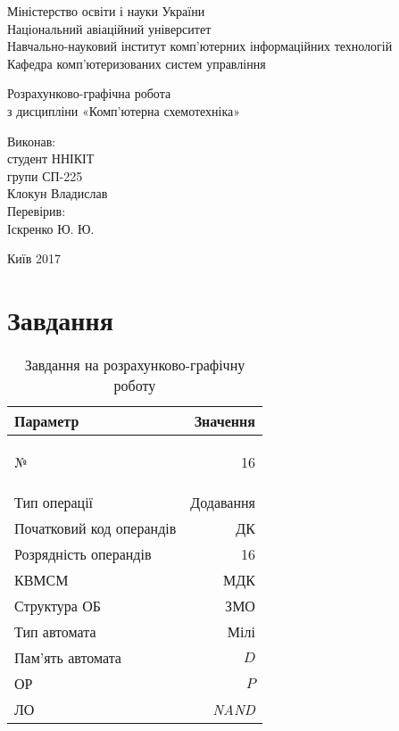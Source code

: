 \documentclass[a4paper,oneside,DIV=12,12pt]{scrartcl}
\begin{document}
	\begin{titlepage}
		\begin{center}
			Міністерство освіти і науки України\\
			Національний авіаційний університет\\
			Навчально-науковий інститут комп'ютерних інформаційних технологій\\
			Кафедра комп'ютеризованих систем управління
			
			\vspace{\fill}
				Розрахунково-графічна робота\\
				з дисципліни «Комп'ютерна схемотехніка»\\
				
			\vspace{\fill}
			
			\begin{flushright}
				Виконав:\\
				студент ННІКІТ\\
				групи СП-225\\
				Клокун Владислав\\
				Перевірив:\\
				Іскренко Ю. Ю.
			\end{flushright}
			Київ 2017
		\end{center}
	\end{titlepage}
	
	\section{Завдання}
		\begin{longtable}[c]{lr}
			\toprule
				Параметр & Значення\\
			\midrule
			\endhead
			\bottomrule
			\caption{Завдання на розрахунково-графічну роботу}
			\endfoot
			\label{tab:rgr-task}
			
			№                        & 16\\
			Тип операції             & Додавання\\
			Початковий код операндів & ДК\\
			Розрядність операндів    & 16\\
			КВМСМ                    & МДК\\
			Структура ОБ             & ЗМО\\
			Тип автомата             & Мілі\\
			Пам'ять автомата         & $D$\\
			ОР                       & $P$\\
			ЛО                       & \textit{NAND}\\
		\end{longtable}
		
\end{document}
